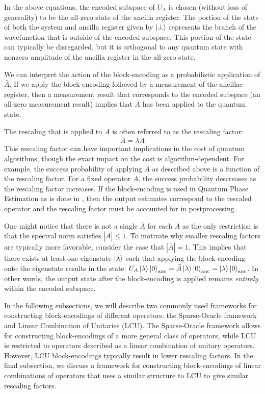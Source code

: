 In the above equations, the encoded subspace of $U_A$ is chosen (without loss of generality) to be the all-zero state of the ancilla register.
The portion of the state of both the system and ancilla register given by $\ket{\perp}$ represents the branch of the wavefunction that is outside of the encoded subspace.
This portion of the state can typically be disregarded, but it is orthogonal to any quantum state with nonzero amplitude of the ancilla register in the all-zero state.

We can interpret the action of the block-encoding as a probabilistic application of $\bar{A}$.
If we apply the block-encoding followed by a measurement of the ancillae register, then a measurement result that corresponds to the encoded subspace (an all-zero measurement result) implies that $\bar{A}$ has been applied to the quantum state.

The rescaling that is applied to $A$ is often referred to as the rescaling factor:
\begin{equation}
    A = \lambda \bar{A}
\end{equation}
This rescaling factor can have important implications in the cost of quantum algorithms, though the exact impact on the cost is algorithm-dependent.
For example, the success probability of applying $\bar{A}$ as described above is a function of the rescaling factor.
For a fixed operator $A$, the success probability descreases as the rescaling factor increases. 
If the block-encoding is used in Quantum Phase Estimation as is done in \cite{poulin2018quantum, babbush2018encoding, lee2021even}, then the output estimates correspond to the rescaled operator and the rescaling factor must be accounted for in postprocessing.

One might notice that there is not a single $\bar{A}$ for each $A$ as the only restriction is that the spectral norm satisfies $|\bar{A}| \leq 1$.
To motivate why smaller rescaling factors are typically more favorable, consider the case that $|\bar{A}| = 1$.
This implies that there exists at least one eigenstate $\ket{\lambda}$ such that applying the block-encoding onto the eigenstate results in the state: $U_A \ket{\lambda}\ket{0}_{\text{anc}} = \bar{A} \ket{\lambda}\ket{0}_{\text{anc}} = \ket{\lambda}\ket{0}_{\text{anc}}$.
In other words, the output state after the block-encoding is applied remains \textit{entirely} within the encoded subspace.

In the following subsections, we will describe two commonly used frameworks for constructing block-encodings of different operators: the Sparse-Oracle framework and Linear Combination of Unitaries (LCU).
The Sparse-Oracle framework allows for constructing block-encodings of a more general class of operators, while LCU is restricted to operators described as a linear combination of unitary operators.
However, LCU block-encodings typically result in lower rescaling factors. 
In the final subsection, we discuss a framework for constructing block-encodings of linear combinations of operators that uses a similar structure to LCU to give similar rescaling factors.


